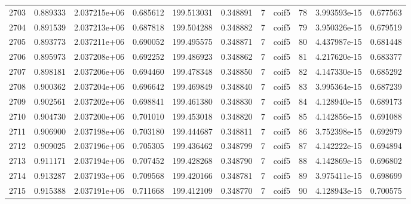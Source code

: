 \begin{tabular}{lrrrrrrlrrr}
2703 &    0.889333 &        2.037215e+06 &  0.685612 &              199.513031 &    0.348891 &       7 &        coif5 &     78 &   3.993593e-15 &      0.677563 \\
2704 &    0.891539 &        2.037213e+06 &  0.687818 &              199.504288 &    0.348882 &       7 &        coif5 &     79 &   3.950326e-15 &      0.679519 \\
2705 &    0.893773 &        2.037211e+06 &  0.690052 &              199.495575 &    0.348871 &       7 &        coif5 &     80 &   4.437987e-15 &      0.681448 \\
2706 &    0.895973 &        2.037208e+06 &  0.692252 &              199.486923 &    0.348862 &       7 &        coif5 &     81 &   4.217620e-15 &      0.683377 \\
2707 &    0.898181 &        2.037206e+06 &  0.694460 &              199.478348 &    0.348850 &       7 &        coif5 &     82 &   4.147330e-15 &      0.685292 \\
2708 &    0.900362 &        2.037204e+06 &  0.696642 &              199.469849 &    0.348840 &       7 &        coif5 &     83 &   3.995364e-15 &      0.687239 \\
2709 &    0.902561 &        2.037202e+06 &  0.698841 &              199.461380 &    0.348830 &       7 &        coif5 &     84 &   4.128940e-15 &      0.689173 \\
2710 &    0.904730 &        2.037200e+06 &  0.701010 &              199.453018 &    0.348820 &       7 &        coif5 &     85 &   4.142856e-15 &      0.691088 \\
2711 &    0.906900 &        2.037198e+06 &  0.703180 &              199.444687 &    0.348811 &       7 &        coif5 &     86 &   3.752398e-15 &      0.692979 \\
2712 &    0.909025 &        2.037196e+06 &  0.705305 &              199.436462 &    0.348799 &       7 &        coif5 &     87 &   4.142222e-15 &      0.694894 \\
2713 &    0.911171 &        2.037194e+06 &  0.707452 &              199.428268 &    0.348790 &       7 &        coif5 &     88 &   4.142869e-15 &      0.696802 \\
2714 &    0.913287 &        2.037193e+06 &  0.709568 &              199.420166 &    0.348781 &       7 &        coif5 &     89 &   3.975411e-15 &      0.698699 \\
2715 &    0.915388 &        2.037191e+06 &  0.711668 &              199.412109 &    0.348770 &       7 &        coif5 &     90 &   4.128943e-15 &      0.700575 \\

\end{tabular}
